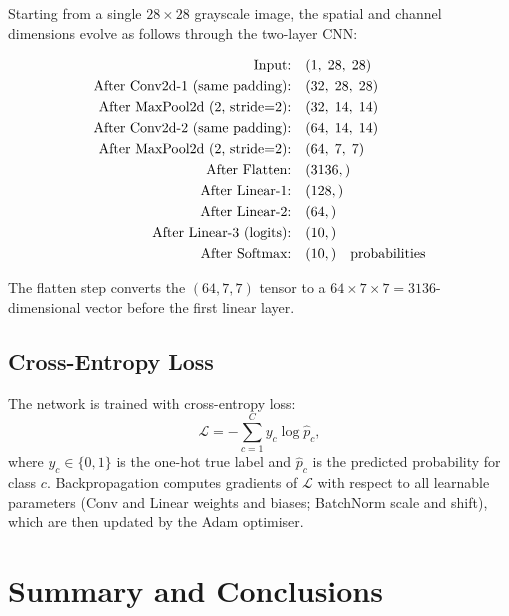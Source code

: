 \documentclass[12pt,a4paper]{article}
\begin{document}
Starting from a single $28\times28$ grayscale image, the spatial and channel
dimensions evolve as follows through the two-layer CNN:

\begin{align}
  \text{Input:} &\quad (1,\; 28,\; 28) \notag \\
  \text{After Conv2d-1 (same padding):} &\quad (32,\; 28,\; 28) \notag \\
  \text{After MaxPool2d (2, stride=2):} &\quad (32,\; 14,\; 14) \notag \\
  \text{After Conv2d-2 (same padding):} &\quad (64,\; 14,\; 14) \notag \\
  \text{After MaxPool2d (2, stride=2):} &\quad (64,\; 7,\; 7) \notag \\
  \text{After Flatten:} &\quad (3136,) \notag \\
  \text{After Linear-1:} &\quad (128,) \notag \\
  \text{After Linear-2:} &\quad (64,) \notag \\
  \text{After Linear-3 (logits):} &\quad (10,) \notag \\
  \text{After Softmax:} &\quad (10,) \quad \text{probabilities}
  \label{eq:dim_trace}
\end{align}

The flatten step converts the $(64, 7, 7)$ tensor to a $64\times7\times7 =
3136$-dimensional vector before the first linear layer.

\subsection{Cross-Entropy Loss}
\label{subsec:loss}

The network is trained with cross-entropy loss:
\begin{equation}
  \mathcal{L} = -\sum_{c=1}^{C} y_c \log \hat{p}_c,
  \label{eq:crossentropy}
\end{equation}
where $y_c \in \{0,1\}$ is the one-hot true label and $\hat{p}_c$ is the
predicted probability for class $c$.  Backpropagation computes gradients of
$\mathcal{L}$ with respect to all learnable parameters (Conv and Linear
weights and biases; BatchNorm scale and shift), which are then updated by the
Adam optimiser.

\section{Summary and Conclusions}
\label{sec:summary}
\end{document}
